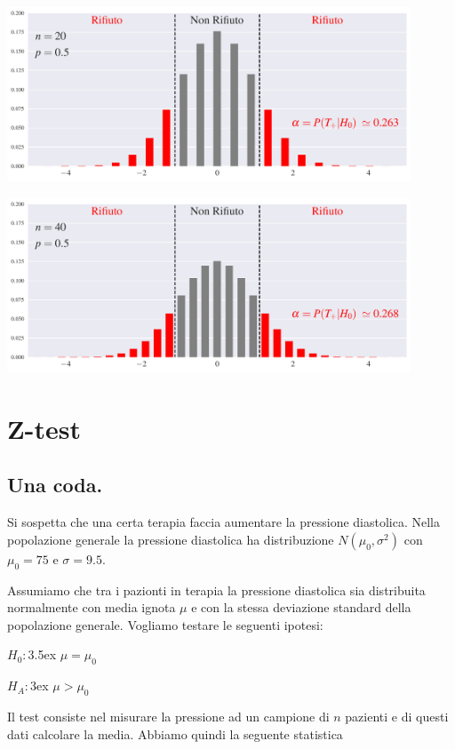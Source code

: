\documentclass[12pt,openany]{book}
\theoremstyle{mio}
\theoremstyle{liscio}
\begin{document}
\hfil\includegraphics[width=0.9\textwidth]{figure/B-test-standard2_01.pdf}

\hfil\includegraphics[width=0.9\textwidth]{figure/B-test-standard2_02.pdf}




\clearpage
\section{Z-test}
\subsection{Una coda.}

Si sospetta che una certa terapia faccia aumentare la pressione diastolica. Nella popolazione generale la pressione diastolica ha distribuzione $N(\mu_0,\sigma^2)$ con $\mu_0=75$ e $\sigma=9.5$. 

Assumiamo che tra i pazionti in terapia la pressione diastolica sia distribuita normalmente con media ignota $\mu$ e con la stessa deviazione standard della popolazione generale. Vogliamo testare le seguenti ipotesi:

$H_0:$\kern3.5ex $\mu=\mu_0$

$H_A:$\kern3ex $\mu>\mu_0$

Il test consiste nel misurare la pressione ad un campione di $n$ pazienti e di questi dati calcolare la media. Abbiamo quindi la seguente statistica

\end{document}
